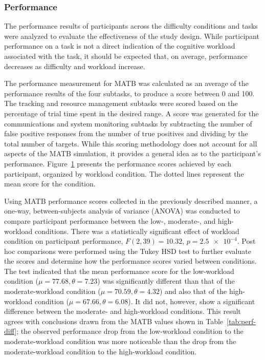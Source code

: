 \documentclass[11pt]{article}
\begin{document}
		\subsubsection{Performance}
		The performance results of participants across the difficulty conditions and tasks were analyzed to evaluate the effectiveness of the study design. While participant performance on a task is not a direct indication of the cognitive workload associated with the task, it should be expected that, on average, performance decreases as difficulty and workload increase.  

		The performance measurement for MATB was calculated as an average of the performance results of the four subtasks, to produce a score between 0 and 100. The tracking and resource management subtasks were scored based on the percentage of trial time spent in the desired range. A score was generated for the communications and system monitoring subtasks by subtracting the number of false positive responses from the number of true positives and dividing by the total number of targets. While this scoring methodology does not account for all aspects of the MATB simulation, it provides a general idea as to the participant's performance. Figure~\ref{fig:matb-perf} presents the performance scores achieved by each participant, organized by workload condition. The dotted lines represent the mean score for the condition. 
		
		\begin{figure}
		\centering
		\caption{}
		\label{fig:matb-perf}
		\end{figure} 
		
		Using MATB performance scores collected in the previously described manner, a one-way, between-subjects analysis of variance (ANOVA) was conducted to compare participant performance between the low-, moderate-, and high-workload conditions. There was a statistically significant effect of workload condition on participant performance, \(F(2, 39) = 10.32\), \(p = \num{2.5e-4}\). Post hoc comparisons were performed using the Tukey HSD test to further evaluate the scores and determine how the performance scores varied between conditions. The test indicated that the mean performance score for the low-workload condition (\(\mu = 77.68, \theta = 7.23\)) was significantly different than that of the moderate-workload condition (\(\mu = 70.59, \theta = 4.32\)) and also that of the high-workload condition (\(\mu = 67.66, \theta = 6.08\)). It did not, however, show a significant difference between the moderate- and high-workload conditions. This result agrees with conclusions drawn from the MATB values shown in Table~\ref{tab:perf-diff}; the observed performance drop from the low-workload condition to the moderate-workload condition was more noticeable than the drop from the moderate-workload condition to the high-workload condition.
		
\end{document}

